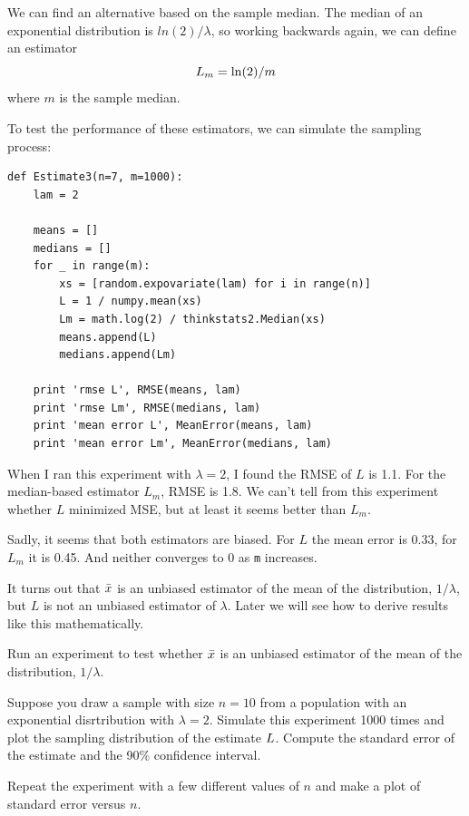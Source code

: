 \documentclass[12pt]{book}
\begin{document}
We can find an alternative based on the sample median.
The median of an exponential distribution is $ln(2) / \lambda$,
so working backwards again, we can define an estimator
%
\[ L_m = \ln(2) / m \]
%
where $m$ is the sample median.

To test the performance of these estimators, we can simulate the
sampling process:

\begin{verbatim}
def Estimate3(n=7, m=1000):
    lam = 2

    means = []
    medians = []
    for _ in range(m):
        xs = [random.expovariate(lam) for i in range(n)]
        L = 1 / numpy.mean(xs)
        Lm = math.log(2) / thinkstats2.Median(xs)
        means.append(L)
        medians.append(Lm)

    print 'rmse L', RMSE(means, lam)
    print 'rmse Lm', RMSE(medians, lam)
    print 'mean error L', MeanError(means, lam)
    print 'mean error Lm', MeanError(medians, lam)
\end{verbatim}

When I ran this experiment with $\lambda=2$, I found the RMSE of $L$ is 
1.1.  For the median-based estimator $L_m$, RMSE is 1.8.  We can't
tell from this experiment whether $L$ minimized MSE, but at least
it seems better than $L_m$.

Sadly, it seems that both estimators are biased.  For $L$ the mean
error is 0.33, for $L_m$ it is 0.45.  And neither converges to 0
as {\tt m} increases.

It turns out that $\bar{x}$ is an unbiased estimator of the mean
of the distribution, $1 / \lambda$, but $L$ is not an unbiased
estimator of $\lambda$.  Later we will see how to derive results
like this mathematically.

\begin{exercise}

Run an experiment to test whether $\bar{x}$ is an unbiased estimator of
the mean of the distribution, $1 / \lambda$.

\end{exercise}

\begin{exercise}

Suppose you draw a sample with size $n=10$ from a population 
with an exponential disrtribution with $\lambda=2$.  Simulate
this experiment 1000 times and plot the sampling distribution of
the estimate $L$.  Compute the standard error of the estimate
and the 90\% confidence interval.

Repeat the experiment with a few different values of $n$ and make
a plot of standard error versus $n$.

\end{exercise}
\end{document}
